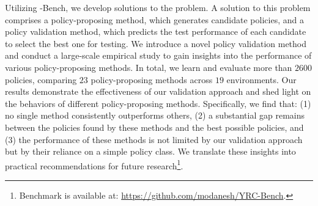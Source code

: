 Utilizing \ourMethod-Bench, we develop solutions to the \ourMethod problem. 
A solution to this problem comprises a policy-proposing method, which generates candidate policies, and a policy validation method, which predicts the test performance of each candidate to select the best one for testing.
We introduce a novel policy validation method and conduct a large-scale empirical study to gain insights into the performance of various policy-proposing methods.
In total, we learn and evaluate more than $2600$ policies, comparing $23$ policy-proposing methods across $19$ environments.
Our results demonstrate the effectiveness of our validation approach and shed light on the behaviors of different policy-proposing methods.
Specifically, we find that: (1) no single method consistently outperforms others, (2) a substantial gap remains between the policies found by these methods and the best possible policies, and (3) the performance of these methods is not limited by our validation approach but by their reliance on a simple policy class.
We translate these insights into practical recommendations for future research\footnote{Benchmark is available at: \url{https://github.com/modanesh/YRC-Bench}.}.







